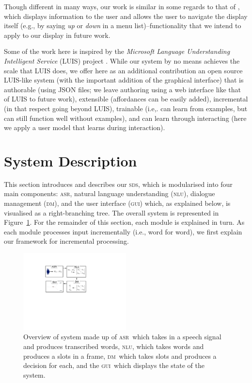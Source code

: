 \documentclass[11pt]{article}
\newcommand{\sds}[0]{\textsc{sds}}
\newcommand{\nlu}[0]{\textsc{nlu}}
\newcommand{\asr}[0]{\textsc{asr}}
\newcommand{\dm}[0]{\textsc{dm}}
\newcommand{\ui}[0]{\textsc{gui}}
\begin{document}
Though different in many ways, our work is similar in some regards to that of , which displays information to the user and allows the user to navigate the display itself (e.g., by saying \emph{up} or \emph{down} in a menu list)--functionality that we intend to apply to our display in future work. 

Some of the work here is inspired by the \emph{Microsoft Language Understanding Intelligent Service} (LUIS) project \cite{Williams2015_sigdial}. While our system by no means achieves the scale that LUIS does, we offer here as an additional contribution an open source LUIS-like system (with the important addition of the graphical interface) that is authorable (using JSON files; we leave authoring using a web interface like that of LUIS to future work), extensible (affordances can be easily added), incremental (in that respect going beyond LUIS), trainable (i.e,. can learn from examples, but can still function well without examples), and can learn through interacting (here we apply a user model that learns during interaction). 

\section{System Description}
\label{section:system_def}

This section introduces and describes our \sds, which is modularised into four main components: \asr, natural language understanding (\nlu), dialogue management (\dm), and the user interface (\ui) which, as explained below, is visualised as a right-branching tree. The overall system is represented in Figure~\ref{fig:overview}. For the remainder of this section, each module is explained in turn. As each module processes input incrementally (i.e., word for word), we first explain our framework for incremental processing.

\begin{figure}[ht]
  \centering
      \includegraphics[width=0.5\textwidth]{figures/sig16-overview.pdf}	
      \caption{Overview of system made up of \asr\ which takes in a speech signal and produces transcribed words, \nlu, which takes words and produces a slots in a frame, \dm\ which takes slots and produces a decision for each, and the \ui\ which displays the state of the system. \label{fig:overview}}
\end{figure}
\end{document}
